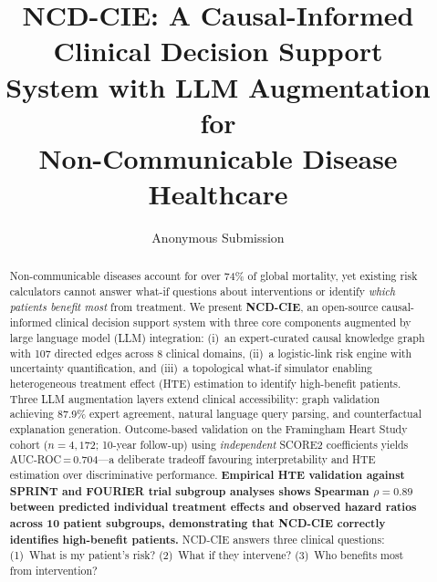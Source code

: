 \documentclass[runningheads]{llncs}
\begin{document}
\title{NCD-CIE: A Causal-Informed Clinical Decision Support\\System with LLM Augmentation for\\Non-Communicable Disease Healthcare}

\author{Anonymous Submission}

\maketitle

\begin{abstract}
Non-communicable diseases account for over 74\% of global mortality,
yet existing risk calculators cannot answer what-if questions about
interventions or identify \emph{which patients benefit most} from
treatment.
We present \textbf{NCD-CIE}, an open-source causal-informed clinical
decision support system with three core components augmented by large
language model (LLM) integration:
(i)~an expert-curated causal knowledge graph with 107 directed edges
across 8 clinical domains,
(ii)~a logistic-link risk engine with uncertainty quantification, and
(iii)~a topological what-if simulator enabling heterogeneous treatment
effect (HTE) estimation to identify high-benefit patients.
Three LLM augmentation layers extend clinical accessibility:
graph validation achieving 87.9\% expert agreement,
natural language query parsing, and
counterfactual explanation generation.
Outcome-based validation on the Framingham Heart Study cohort
($n\!=\!4{,}172$; 10-year follow-up) using \emph{independent} SCORE2
coefficients yields AUC-ROC\,=\,0.704---a deliberate tradeoff
favouring interpretability and HTE estimation over discriminative
performance.
\textbf{Empirical HTE validation against SPRINT and FOURIER trial
subgroup analyses shows Spearman $\rho = 0.89$ between predicted
individual treatment effects and observed hazard ratios across
10 patient subgroups, demonstrating that NCD-CIE correctly identifies
high-benefit patients.}
NCD-CIE answers three clinical questions: (1)~What is my patient's
risk? (2)~What if they intervene? (3)~Who benefits most from
intervention?

\end{abstract}
\end{document}
